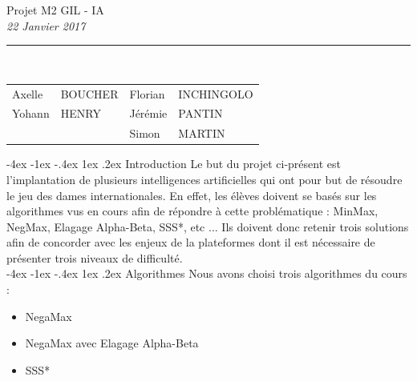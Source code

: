\documentclass[a4paper]{article}
\makeatletter
\renewcommand{\section}{\@startsection{section}{1}{\z@}
{-4ex \@plus -1ex \@minus -.4ex}
{1ex \@plus.2ex }
{\normalfont\large\sffamily\bfseries}}
\renewcommand{\arraystretch}{1.5}
\makeatother
\begin{document}
\begin{titlepage}
	\begin{center}
		{\fontsize{22}{30}\selectfont Projet M2 GIL - IA}\\[\baselineskip]
		\vspace*{10pt}
		{\Large\itshape 22 Janvier 2017}\\
		\vfill
		\rule{0.6\textwidth}{0.4pt}\\[\baselineskip]
		\begin{table}[h]
			\centering
			\def\arraystretch{1.4}
			\begin{tabular}{ll|ll}
				Axelle & BOUCHER & Florian & INCHINGOLO\\
				Yohann & HENRY & Jérémie & PANTIN\\
				& & Simon & MARTIN\\
			\end{tabular}
		\end{table}
	\end{center}
\end{titlepage}

\thispagestyle{empty}


\tableofcontents
\newpage

\setcounter{page}{1}
\vspace*{0.5cm}

\section{Introduction}
Le but du projet ci-présent est l'implantation de plusieurs intelligences artificielles qui ont pour but de résoudre le jeu des dames internationales. En effet, les élèves doivent se basés sur les algorithmes vus en cours afin de répondre à cette problématique : MinMax, NegMax, Elagage Alpha-Beta, SSS*, etc ... Ils doivent donc retenir trois solutions afin de concorder avec les enjeux de la plateformes dont il est nécessaire de présenter trois niveaux de difficulté.\\

\section{Algorithmes}
Nous avons choisi trois algorithmes du cours :

\begin{itemize}
\item NegaMax
\item NegaMax avec Elagage Alpha-Beta
\item SSS*
\end{itemize}
\end{document}
